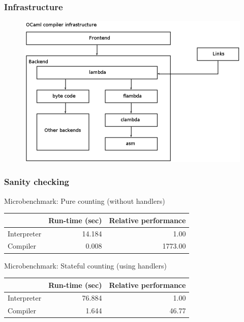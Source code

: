 \documentclass[10pt,compress]{beamer}
\begin{document}
\begin{frame}
  \frametitle{Infrastructure}
\begin{figure}
  \includegraphics[scale=0.4]{infrastructure.png}
\end{figure}
\end{frame}

\begin{frame}
  \frametitle{Sanity checking}
  Microbenchmark: Pure counting (without handlers)
  \begin{table}
    \begin{tabular}{| l | r | r|}
      \hline
                  & Run-time (sec) & Relative performance \\
      \hline
      Interpreter & 14.184         & 1.00 \\
      \hline
      Compiler    & 0.008          & 1773.00 \\
      \hline
    \end{tabular}
  \end{table}

  Microbenchmark: Stateful counting (using handlers)
  \begin{table}
    \begin{tabular}{| l | r | r|}
      \hline
                  & Run-time (sec) & Relative performance \\
      \hline
      Interpreter & 76.884         & 1.00 \\
      \hline
      Compiler    & 1.644          & 46.77 \\
      \hline
    \end{tabular}
  \end{table}

\end{frame}
\end{document}

